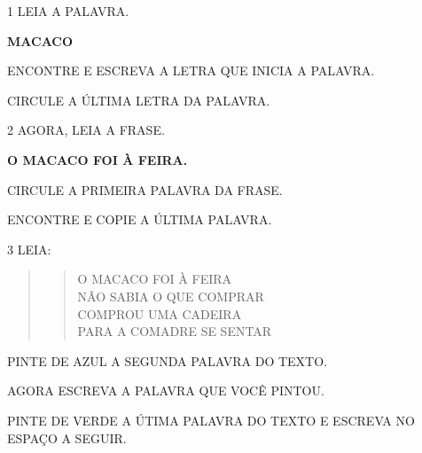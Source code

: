 \num{1} LEIA A PALAVRA.

\begin{myquote}
\textbf{MACACO}
\end{myquote}

\begin{escolha}
\item ENCONTRE E ESCREVA A LETRA QUE INICIA A PALAVRA.

\item CIRCULE A ÚLTIMA LETRA DA PALAVRA.
\end{escolha}

\num{2} AGORA, LEIA A FRASE.

\begin{myquote}
\textbf{O MACACO FOI À FEIRA.}
\end{myquote}

\begin{escolha}
\item CIRCULE A PRIMEIRA PALAVRA DA FRASE.

\item ENCONTRE E COPIE A ÚLTIMA PALAVRA.
\end{escolha}\enlargethispage{5\baselineskip}

\num{3} LEIA:

\begin{quote}
\begin{verse}
O MACACO FOI À FEIRA\\
NÃO SABIA O QUE COMPRAR\\
COMPROU UMA CADEIRA\\
PARA A COMADRE SE SENTAR
\end{verse}

\end{quote}
\pagebreak

\begin{escolha}
\item PINTE DE AZUL A SEGUNDA PALAVRA DO TEXTO.

\item AGORA ESCREVA A PALAVRA QUE VOCÊ PINTOU.


\item PINTE DE VERDE A ÚTIMA PALAVRA DO TEXTO E ESCREVA NO ESPAÇO A SEGUIR.

\end{escolha}

